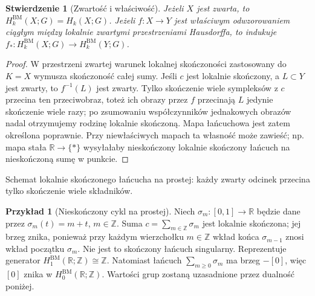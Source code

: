 \documentclass[11pt,a4paper,oneside]{report}
\newcommand{\R}{\mathbb{R}}
\newcommand{\Z}{\mathbb{Z}}
\theoremstyle{plain}
\newtheorem{stwierdzenie}[twierdzenie]{Stwierdzenie}
\theoremstyle{definition}
\newtheorem{przyklad}[twierdzenie]{Przykład}
\theoremstyle{remark}
\begin{document}
\begin{stwierdzenie}[Zwartość i właściwość]
\label{prop:BM-proper-v11}
Jeżeli $X$ jest zwarta, to $H_k^{\mathrm{BM}}(X;G)=H_k(X;G)$.
Jeżeli $f:X\to Y$ jest właściwym odwzorowaniem ciągłym
między lokalnie zwartymi przestrzeniami Hausdorffa,
to indukuje $f_*:H_k^{\mathrm{BM}}(X;G)\to H_k^{\mathrm{BM}}(Y;G)$.
\end{stwierdzenie}
\begin{proof}
W przestrzeni zwartej warunek lokalnej skończoności
zastosowany do $K=X$ wymusza skończoność całej sumy.
Jeśli $c$ jest lokalnie skończony, a $L\subset Y$ jest zwarty,
to $f^{-1}(L)$ jest zwarty. Tylko skończenie wiele
sympleksów z $c$ przecina ten przeciwobraz, toteż
ich obrazy przez $f$ przecinają $L$ jedynie skończenie
wiele razy; po zsumowaniu współczynników jednakowych
obrazów nadal otrzymujemy rodzinę lokalnie skończoną.
Mapa łańcuchowa jest zatem określona
poprawnie. Przy niewłaściwych mapach ta własność
może zawieść; np. mapa stała $\R\to\{*\}$
wysyłałaby nieskończony lokalnie skończony łańcuch
na nieskończoną sumę w punkcie.
\end{proof}

\begin{center}
\par\smallskip\small Schemat lokalnie skończonego łańcucha na prostej:
każdy zwarty odcinek przecina tylko skończenie wiele składników.
\end{center}

\begin{przyklad}[Nieskończony cykl na prostej]
\label{ex:BM-line-v11}
Niech $\sigma_m:[0,1]\to\R$ będzie dane przez
$\sigma_m(t)=m+t$, $m\in\Z$. Suma
$c=\sum_{m\in\Z}\sigma_m$ jest lokalnie skończona;
jej brzeg znika, ponieważ przy każdym wierzchołku
$m\in\Z$ wkład końca $\sigma_{m-1}$ znosi wkład
początku $\sigma_m$. Nie jest to skończony łańcuch
singularny. Reprezentuje generator
$H_1^{\mathrm{BM}}(\R;\Z)\cong\Z$.
Natomiast łańcuch $\sum_{m\ge0}\sigma_m$ ma brzeg
$-[0]$, więc $[0]$ znika w $H_0^{\mathrm{BM}}(\R;\Z)$.
Wartości grup zostaną uzasadnione przez dualność poniżej.
\end{przyklad}
\end{document}
